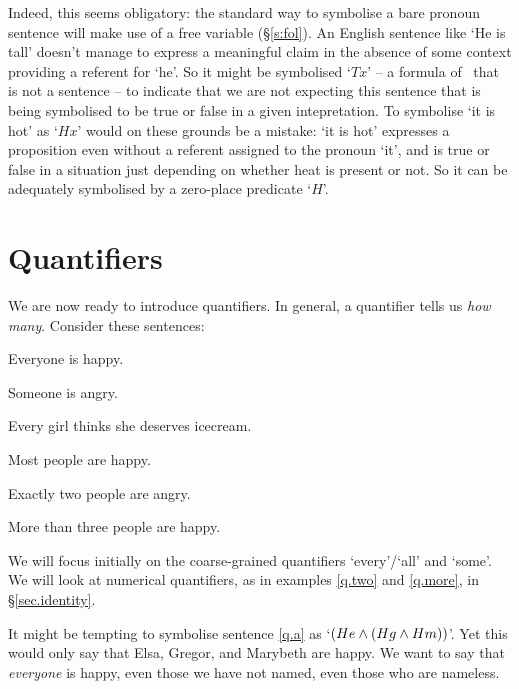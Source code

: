 Indeed, this seems obligatory: the standard way to symbolise a bare pronoun sentence will make use of a free variable (§\ref{s:fol}). An English sentence like `He is tall' doesn't manage to express a meaningful claim in the absence of some context providing a referent for `he'. So it might be symbolised `$Tx$' – a formula of \FOL\ that is not a sentence – to indicate that we are not expecting this sentence that is being symbolised to be true or false in a given intepretation. To symbolise `it is hot' as `$Hx$' would on these grounds be a mistake: `it is hot' expresses a proposition even without a referent assigned to the pronoun `it', and is true or false in a situation just depending on whether heat is present or not. So it can be adequately symbolised by a zero-place predicate `$H$'.


 

\section{Quantifiers}\label{quant.pron}
We are now ready to introduce quantifiers. In general, a quantifier tells us \emph{how many}. Consider these sentences:
	\begin{earg}
		\item[\ex{q.a}] Everyone is happy.
		\item[\ex{q.e}] Someone is angry.
		\item[\ex{q.eg}] Every girl thinks she deserves icecream.
		\item[\ex{q.most}] Most people are happy.
		\item[\ex{q.two}] Exactly two people are angry.
		\item[\ex{q.more}] More than three people are happy.
	\end{earg}
We will focus initially on the coarse-grained quantifiers `every'/`all' and `some'. We will look at numerical quantifiers, as in examples \ref{q.two} and \ref{q.more}, in §\ref{sec.identity}.

It might be tempting to symbolise sentence \ref{q.a} as `$(He \wedge (Hg \wedge Hm))$'. Yet this would only say that Elsa, Gregor, and Marybeth are happy. We want to say that \emph{everyone} is happy, even those we have not named, even those who are nameless. %


